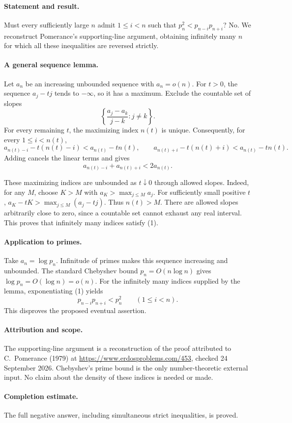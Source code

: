 \paragraph{Statement and result.}
Must every sufficiently large \(n\) admit \(1\leq i<n\) such that
\(p_n^2<p_{n-i}p_{n+i}\)? No. We reconstruct Pomerance's supporting-line
argument, obtaining infinitely many \(n\) for which all these inequalities
are reversed strictly.

\paragraph{A general sequence lemma.}
Let \(a_n\) be an increasing unbounded sequence with \(a_n=o(n)\).
For \(t>0\), the sequence \(a_j-tj\) tends to \(-\infty\), so it has
a maximum. Exclude the countable set of slopes
\[
 \left\{\frac{a_j-a_k}{j-k}:j\ne k\right\}.
\]
For every remaining \(t\), the maximizing index \(n(t)\) is unique.
Consequently, for every \(1\leq i<n(t)\),
\[
 a_{n(t)-i}-t(n(t)-i)<a_{n(t)}-tn(t),\qquad
 a_{n(t)+i}-t(n(t)+i)<a_{n(t)}-tn(t).
\]
Adding cancels the linear terms and gives
\[
 a_{n(t)-i}+a_{n(t)+i}<2a_{n(t)}.
 \tag{1}
\]

These maximizing indices are unbounded as \(t\downarrow0\) through
allowed slopes. Indeed, for any \(M\), choose \(K>M\) with
\(a_K>\max_{j\leq M}a_j\). For sufficiently small positive \(t\),
\(a_K-tK>\max_{j\leq M}(a_j-tj)\). Thus \(n(t)>M\).
There are allowed slopes arbitrarily close to zero, since a countable
set cannot exhaust any real interval. This proves that infinitely many
indices satisfy (1).

\paragraph{Application to primes.}
Take \(a_n=\log p_n\). Infinitude of primes makes this sequence
increasing and unbounded. The standard Chebyshev bound
\(p_n=O(n\log n)\) gives \(\log p_n=O(\log n)=o(n)\).
For the infinitely many indices supplied by the lemma, exponentiating
(1) yields
\[
 p_{n-i}p_{n+i}<p_n^2\qquad(1\leq i<n).
\]
This disproves the proposed eventual assertion.

\paragraph{Attribution and scope.}
The supporting-line argument is a reconstruction of the proof attributed
to C.~Pomerance (1979) at \url{https://www.erdosproblems.com/453},
checked 24 September 2026. Chebyshev's prime bound is the only
number-theoretic external input. No claim about the density of these
indices is needed or made.

\paragraph{Completion estimate.}
The full negative answer, including simultaneous strict inequalities, is proved.
